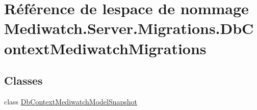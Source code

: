 \hypertarget{namespace_mediwatch_1_1_server_1_1_migrations_1_1_db_context_mediwatch_migrations}{}\section{Référence de l\textquotesingle{}espace de nommage Mediwatch.\+Server.\+Migrations.\+Db\+Context\+Mediwatch\+Migrations}
\label{namespace_mediwatch_1_1_server_1_1_migrations_1_1_db_context_mediwatch_migrations}
\subsection*{Classes}
\begin{DoxyCompactItemize}
\item 
class \hyperlink{class_mediwatch_1_1_server_1_1_migrations_1_1_db_context_mediwatch_migrations_1_1_db_context_mediwatch_model_snapshot}{Db\+Context\+Mediwatch\+Model\+Snapshot}
\end{DoxyCompactItemize}
